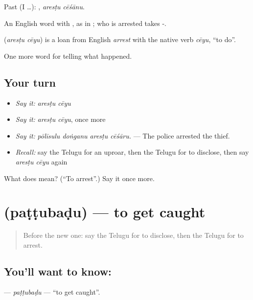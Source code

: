 Past (I …):  , \emph{aresṭu cēśānu}.

An English word with , as in  ; who is arrested takes -.

\begin{cousinweb}
\textbf{ } (\emph{aresṭu cēyu}) is a loan from English \emph{arrest} with the native verb \emph{cēyu}, \textquotedblleft{}to do\textquotedblright{}.
\end{cousinweb}

\begin{grammarlens}[title={What you've built}]
One more word for telling what happened.
\end{grammarlens}

\subsection*{Your turn}
\begin{itemize}
\raggedright
  \item \emph{Say it:} \emph{aresṭu cēyu}
  \item \emph{Say it:} \emph{aresṭu cēyu}, once more
  \item \emph{Say it:} \emph{pōlīsulu doṅganu aresṭu cēśāru.} — The police arrested the thief.
  \item \emph{Recall:} say the Telugu for an uproar, then the Telugu for to disclose, then say \emph{aresṭu cēyu} again
\end{itemize}

\begin{tcolorbox}[breakable,colback=teal!4,colframe=teal!35!black,title={Before you move on}]
What does   mean? (\textquotedblleft{}To arrest\textquotedblright{}.) Say it once more.
\end{tcolorbox}
\section[\texorpdfstring{\te{పట్టుబడు} (paṭṭubaḍu)}{పట్టుబడు (paṭṭubaḍu)}]{ (paṭṭubaḍu) — to get caught}

\label{lesson:TE-C337-pattubadu}



\begin{quote}
Before the new one: say the Telugu for to disclose, then the Telugu for to arrest.
\end{quote}

\subsection*{You'll want to know: }
\textbf{} — \emph{paṭṭubaḍu} — \textquotedblleft{}to get caught\textquotedblright{}.

